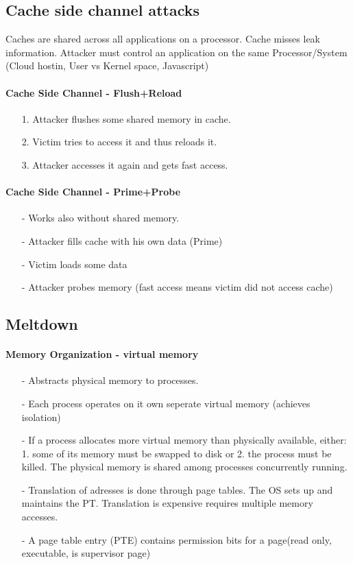 \subsection{Cache side channel attacks}

Caches are shared across all applications on a processor. Cache misses leak information. Attacker must control an application on the same Processor/System (Cloud hostin, User vs Kernel space, Javascript)

\paragraph{Cache Side Channel - Flush+Reload}
\begin{itemize}
    \item[1.]Attacker flushes some shared memory in cache.
    \item[2.]Victim tries to access it and thus reloads it.
    \item[3.]Attacker accesses it again and gets fast access.
\end{itemize}{}

\paragraph{Cache Side Channel - Prime+Probe}
\begin{itemize}
    \item[-]Works also without shared memory.
    \item[-]Attacker fills cache with his own data (Prime)
    \item[-]Victim loads some data
    \item[-]Attacker probes memory (fast access means victim did not access cache)
\end{itemize}{}

\subsection{Meltdown}

\paragraph{Memory Organization - virtual memory}
\begin{itemize}
    \item[-]Abstracts physical memory to processes.
    \item[-]Each process operates on it own seperate virtual memory (achieves isolation)
    \item[-]If a process allocates more virtual memory than physically available, either: 1. some of its memory must be swapped to disk or 2. the process must be killed. The physical memory is shared among processes concurrently running.
    \item[-]Translation of adresses is done through page tables. The OS sets up and maintains the PT. Translation is expensive requires multiple memory accesses.
    \item[-]A page table entry (PTE) contains permission bits for a page(read only, executable, is supervisor page)
\end{itemize}{}

